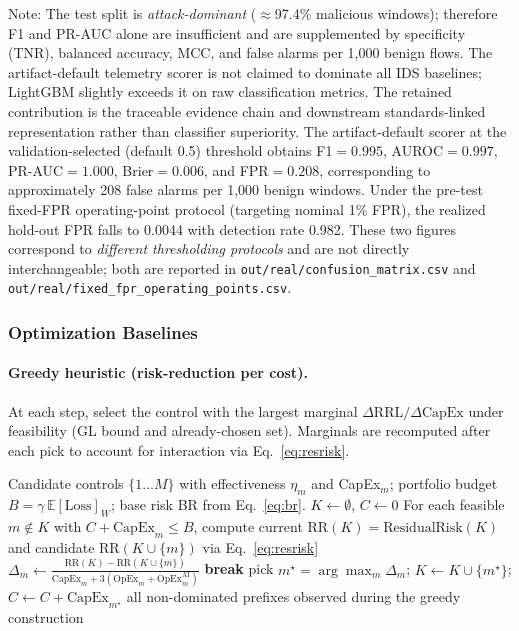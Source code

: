 \documentclass[preprint,12pt]{elsarticle}
\def\textsubscript#1{#1}%
\begin{document}
\begin{flushleft}\footnotesize
Note: The test split is \emph{attack-dominant} ($\approx$97.4\% malicious windows); therefore F\textsubscript{1} and PR-AUC alone are insufficient and are supplemented by specificity (TNR), balanced accuracy, MCC, and false alarms per 1,000 benign flows. The artifact-default telemetry scorer is not claimed to dominate all IDS baselines; LightGBM slightly exceeds it on raw classification metrics. The retained contribution is the traceable evidence chain and downstream standards-linked representation rather than classifier superiority. The artifact-default scorer at the validation-selected (default 0.5) threshold obtains F\textsubscript{1}$=0.995$, AUROC$=0.997$, PR-AUC$=1.000$, Brier$=0.006$, and FPR$=0.208$, corresponding to approximately 208 false alarms per 1,000 benign windows. Under the pre-test fixed-FPR operating-point protocol (targeting nominal 1\% FPR), the realized hold-out FPR falls to 0.0044 with detection rate 0.982. These two figures correspond to \emph{different thresholding protocols} and are not directly interchangeable; both are reported in \texttt{out/real/confusion\_matrix.csv} and \texttt{out/real/fixed\_fpr\_operating\_points.csv}.
\end{flushleft}

\subsubsection*{Optimization Baselines}
\label{sec:opt_baselines}

\paragraph{Greedy heuristic (risk-reduction per cost).}
At each step, select the control with the largest marginal $\Delta\text{RRL}/\Delta\text{CapEx}$ under feasibility (GL bound and already-chosen set). Marginals are recomputed after each pick to account for interaction via Eq.~\eqref{eq:resrisk}.

\begin{algorithm}[H]
\caption{Greedy selection under GL bound}
\label{alg:greedy}
\begin{algorithmic}[1]
\Require Candidate controls $\{1\ldots M\}$ with effectiveness $\eta_m$ and CapEx$_m$; portfolio budget $B=\gamma\,\mathbb{E}[\mathrm{Loss}]_W$; base risk BR from Eq.~\eqref{eq:br}.
\State $K \gets \emptyset$, $C \gets 0$
  \State For each feasible $m\notin K$ with $C+\mathrm{CapEx}_m \le B$, compute current
  $\text{RR}(K)=\text{ResidualRisk}(K)$ and candidate $\text{RR}(K\cup\{m\})$ via Eq.~\eqref{eq:resrisk}
  \State $\Delta_m \gets \frac{\text{RR}(K)-\text{RR}(K\cup\{m\})}{\mathrm{CapEx}_m + 3(\mathrm{OpEx}_m+\mathrm{OpEx}^{\mathrm{AI}}_m)}$
   \textbf{break}
  \Else pick $m^\star=\arg\max_m \Delta_m$; $K\gets K\cup\{m^\star\}$; $C\gets C+\mathrm{CapEx}_{m^\star}$
  \EndIf
\EndWhile
\State \Return all non-dominated prefixes observed during the greedy construction
\end{algorithmic}
\end{algorithm}
\end{document}
